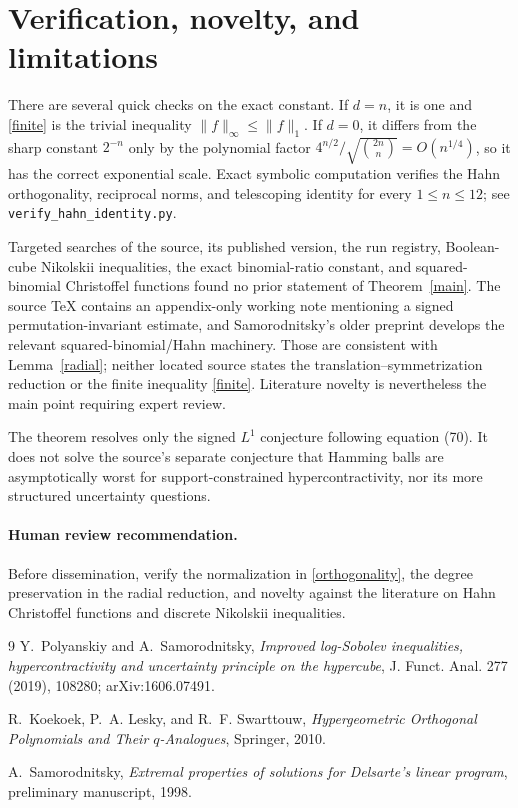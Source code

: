 \documentclass[11pt]{article}
\begin{document}
\section{Verification, novelty, and limitations}

There are several quick checks on the exact constant.  If $d=n$, it is one
and \eqref{finite} is the trivial inequality $\|f\|_\infty\le\|f\|_1$.
If $d=0$, it differs from the sharp constant $2^{-n}$ only by the polynomial
factor $4^{n/2}/\sqrt{\binom{2n}{n}}=O(n^{1/4})$, so it has the correct
exponential scale.  Exact symbolic computation verifies the Hahn
orthogonality, reciprocal norms, and telescoping identity for every
$1\le n\le12$; see \texttt{verify\_hahn\_identity.py}.

Targeted searches of the source, its published version, the run registry,
Boolean-cube Nikolskii inequalities, the exact binomial-ratio constant, and
squared-binomial Christoffel functions found no prior statement of
Theorem~\ref{main}.  The source TeX contains an appendix-only working note
mentioning a signed permutation-invariant estimate, and Samorodnitsky's older
preprint \cite{Sam} develops the relevant squared-binomial/Hahn machinery.
Those are consistent with Lemma~\ref{radial}; neither located source states the
translation--symmetrization reduction or the finite inequality
\eqref{finite}.  Literature novelty is nevertheless the main point requiring
expert review.

The theorem resolves only the signed $L^1$ conjecture following equation
(70).  It does not solve the source's separate conjecture that Hamming balls
are asymptotically worst for support-constrained hypercontractivity, nor its
more structured uncertainty questions.

\paragraph{Human review recommendation.}
Before dissemination, verify the normalization in \eqref{orthogonality}, the
degree preservation in the radial reduction, and novelty against the
literature on Hahn Christoffel functions and discrete Nikolskii inequalities.

\begin{thebibliography}{9}
Y.~Polyanskiy and A.~Samorodnitsky,
\emph{Improved log-Sobolev inequalities, hypercontractivity and uncertainty
principle on the hypercube}, J. Funct. Anal. 277 (2019), 108280;
arXiv:1606.07491.

R.~Koekoek, P.~A. Lesky, and R.~F. Swarttouw,
\emph{Hypergeometric Orthogonal Polynomials and Their $q$-Analogues},
Springer, 2010.

A.~Samorodnitsky,
\emph{Extremal properties of solutions for Delsarte's linear program},
preliminary manuscript, 1998.
\end{thebibliography}
\end{document}
